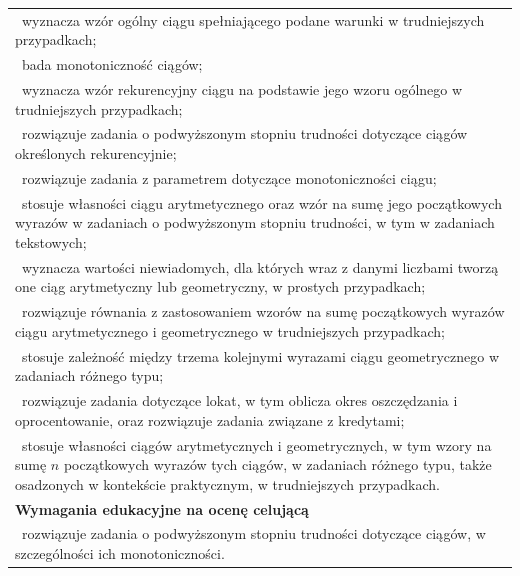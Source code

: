 \documentclass[12pt,a4paper]{article}
\begin{document}
\begin{longtable}{|p{16cm}|}
		\textbullet\ wyznacza wzór ogólny ciągu spełniającego podane warunki w trudniejszych przypadkach; \\
		
		\textbullet\ bada monotoniczność ciągów; \\
		
		\textbullet\ wyznacza wzór rekurencyjny ciągu na podstawie jego wzoru ogólnego w trudniejszych przypadkach; \\
		
		\textbullet\ rozwiązuje zadania o podwyższonym stopniu trudności dotyczące ciągów określonych rekurencyjnie; \\
		
		\textbullet\ rozwiązuje zadania z parametrem dotyczące monotoniczności ciągu; \\
		
		\textbullet\ stosuje własności ciągu arytmetycznego oraz wzór na sumę jego początkowych wyrazów w zadaniach o podwyższonym stopniu trudności, w tym w zadaniach tekstowych; \\
		
		\textbullet\ wyznacza wartości niewiadomych, dla których wraz z danymi liczbami tworzą one ciąg arytmetyczny lub geometryczny, w prostych przypadkach; \\
		
		\textbullet\ rozwiązuje równania z zastosowaniem wzorów na sumę początkowych wyrazów ciągu arytmetycznego i geometrycznego w trudniejszych przypadkach; \\
		
		\textbullet\ stosuje zależność między trzema kolejnymi wyrazami ciągu geometrycznego w zadaniach różnego typu; \\
		
		\textbullet\ rozwiązuje zadania dotyczące lokat, w tym oblicza okres oszczędzania i oprocentowanie, oraz rozwiązuje zadania związane z kredytami; \\
		
		\textbullet\ stosuje własności ciągów arytmetycznych i geometrycznych, w tym wzory na sumę $n$ początkowych wyrazów tych ciągów, w zadaniach różnego typu, także osadzonych w kontekście praktycznym, w trudniejszych przypadkach. \\ \hline
		
		\textbf{Wymagania edukacyjne na ocenę celującą} \\ \hline
		
		\textbullet\ rozwiązuje zadania o podwyższonym stopniu trudności dotyczące ciągów, w szczególności ich monotoniczności. \\ \hline
		
	\end{longtable}
	
\end{document}
